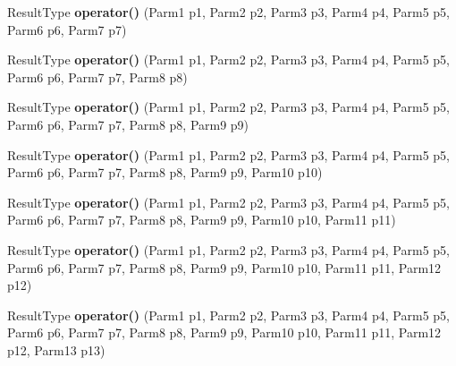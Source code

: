 \begin{DoxyCompactItemize}
\item 
\hypertarget{classLoki_1_1MemFunHandler_a0a95b0a7b1c35a27fe9ddd76a810bc73}{}Result\+Type {\bfseries operator()} (Parm1 p1, Parm2 p2, Parm3 p3, Parm4 p4, Parm5 p5, Parm6 p6, Parm7 p7)\label{classLoki_1_1MemFunHandler_a0a95b0a7b1c35a27fe9ddd76a810bc73}

\item 
\hypertarget{classLoki_1_1MemFunHandler_a253a0a915c594c7fd727471ecc0fdf49}{}Result\+Type {\bfseries operator()} (Parm1 p1, Parm2 p2, Parm3 p3, Parm4 p4, Parm5 p5, Parm6 p6, Parm7 p7, Parm8 p8)\label{classLoki_1_1MemFunHandler_a253a0a915c594c7fd727471ecc0fdf49}

\item 
\hypertarget{classLoki_1_1MemFunHandler_a07f45ca1a005641e142bc420ed2bcccd}{}Result\+Type {\bfseries operator()} (Parm1 p1, Parm2 p2, Parm3 p3, Parm4 p4, Parm5 p5, Parm6 p6, Parm7 p7, Parm8 p8, Parm9 p9)\label{classLoki_1_1MemFunHandler_a07f45ca1a005641e142bc420ed2bcccd}

\item 
\hypertarget{classLoki_1_1MemFunHandler_a131d69bea179cf34e91f5a6f15c2fcaa}{}Result\+Type {\bfseries operator()} (Parm1 p1, Parm2 p2, Parm3 p3, Parm4 p4, Parm5 p5, Parm6 p6, Parm7 p7, Parm8 p8, Parm9 p9, Parm10 p10)\label{classLoki_1_1MemFunHandler_a131d69bea179cf34e91f5a6f15c2fcaa}

\item 
\hypertarget{classLoki_1_1MemFunHandler_aca33c6158a7af7a2ba2025c96c5bf64e}{}Result\+Type {\bfseries operator()} (Parm1 p1, Parm2 p2, Parm3 p3, Parm4 p4, Parm5 p5, Parm6 p6, Parm7 p7, Parm8 p8, Parm9 p9, Parm10 p10, Parm11 p11)\label{classLoki_1_1MemFunHandler_aca33c6158a7af7a2ba2025c96c5bf64e}

\item 
\hypertarget{classLoki_1_1MemFunHandler_a2c53f870e7d2a79bb2587a82929e7133}{}Result\+Type {\bfseries operator()} (Parm1 p1, Parm2 p2, Parm3 p3, Parm4 p4, Parm5 p5, Parm6 p6, Parm7 p7, Parm8 p8, Parm9 p9, Parm10 p10, Parm11 p11, Parm12 p12)\label{classLoki_1_1MemFunHandler_a2c53f870e7d2a79bb2587a82929e7133}

\item 
\hypertarget{classLoki_1_1MemFunHandler_a7b770673a02001f457446b2d72155c4f}{}Result\+Type {\bfseries operator()} (Parm1 p1, Parm2 p2, Parm3 p3, Parm4 p4, Parm5 p5, Parm6 p6, Parm7 p7, Parm8 p8, Parm9 p9, Parm10 p10, Parm11 p11, Parm12 p12, Parm13 p13)\label{classLoki_1_1MemFunHandler_a7b770673a02001f457446b2d72155c4f}


\end{DoxyCompactItemize}
